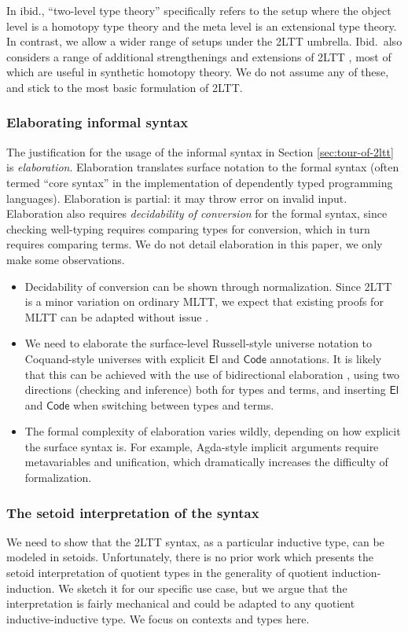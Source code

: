 \documentclass[acmsmall,anonymous,review]{acmart}
\newcommand{\msf}[1]{\mathsf{#1}}
\newcommand{\Code}{\msf{Code}}
\newcommand{\El}{\msf{El}}
\theoremstyle{remark}
\begin{document}
In ibid., ``two-level type theory'' specifically refers to the setup
where the object level is a homotopy type theory and the meta level is an
extensional type theory. In contrast, we allow a wider range of setups under the
2LTT umbrella. Ibid.\ also considers a range of additional
strengthenings and extensions of 2LTT \cite[Section~2.4]{twolevel}, most of which
are useful in synthetic homotopy theory. We do not assume any of these, and
stick to the most basic formulation of 2LTT.

\subsubsection{Elaborating informal syntax}
The justification for the usage of the informal syntax in Section
\ref{sec:tour-of-2ltt} is \emph{elaboration}. Elaboration translates surface
notation to the formal syntax (often termed ``core syntax'' in the
implementation of dependently typed programming languages). Elaboration is
partial: it may throw error on invalid input. Elaboration also requires
\emph{decidability of conversion} for the formal syntax, since checking
well-typing requires comparing types for conversion, which in turn requires
comparing terms.  We do not detail elaboration in this paper, we only make
some observations.
\begin{itemize}
\item Decidability of conversion can be shown through normalization. Since 2LTT
      is a minor variation on ordinary MLTT, we expect that existing proofs for MLTT
      can be adapted without issue \cite{coquand2018canonicity,decidableconv}.
\item We need to elaborate the surface-level Russell-style universe notation to
      Coquand-style universes with explicit $\El$ and $\Code$ annotations. It is
      likely that this can be achieved with the use of bidirectional elaboration
      \cite{DBLP:journals/csur/DunfieldK21}, using two directions (checking and
      inference) both for types and terms, and inserting $\El$ and $\Code$ when
      switching between types and terms.
\item The formal complexity of elaboration varies wildly, depending on how
      explicit the surface syntax is. For example, Agda-style implicit arguments
      require metavariables and unification, which dramatically increases the
      difficulty of formalization.
\end{itemize}

\subsubsection{The setoid interpretation of the syntax} We need to show
that the 2LTT syntax, as a particular inductive type, can be modeled in setoids.
Unfortunately, there is no prior work which presents the setoid interpretation
of quotient types in the generality of quotient induction-induction. We sketch
it for our specific use case, but we argue that the interpretation is fairly
mechanical and could be adapted to any quotient inductive-inductive type.
We focus on contexts and types here.
\end{document}
